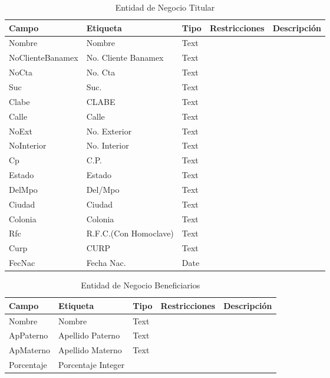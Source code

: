 \begin{table}[H]
	\caption{Entidad de Negocio Titular}
	\label{tab:fields-dom-TitularContrato}
	\begin{center}
	\begin{tabularx}{0.90\linewidth}{ X X X X X }
		\hline
		\textbf{Campo} &
		\textbf{Etiqueta} &
		\textbf{Tipo} &
		\textbf{Restricciones} &
		\textbf{Descripci\'on} \\
		\hline
		Nombre &
		Nombre &
		Text &
		 &
		 \\
		NoClienteBanamex &
		No. Cliente Banamex &
		Text &
		 &
		 \\
		NoCta &
		No. Cta &
		Text &
		 &
		 \\
		Suc &
		Suc. &
		Text &
		 &
		 \\
		Clabe &
		CLABE &
		Text &
		 &
		 \\
		Calle &
		Calle &
		Text &
		 &
		 \\
		NoExt &
		No. Exterior &
		Text &
		 &
		 \\
		NoInterior &
		No. Interior &
		Text &
		 &
		 \\
		Cp &
		C.P. &
		Text &
		 &
		 \\
		Estado &
		Estado &
		Text &
		 &
		 \\
		DelMpo &
		Del/Mpo &
		Text &
		 &
		 \\
		Ciudad &
		Ciudad &
		Text &
		 &
		 \\
		Colonia &
		Colonia &
		Text &
		 &
		 \\
		Rfc &
		R.F.C.(Con Homoclave) &
		Text &
		 &
		 \\
		Curp &
		CURP &
		Text &
		 &
		 \\
		FecNac &
		Fecha Nac. &
		Date &
		 &
		 \\
		\hline
	\end{tabularx}
	\end{center}
\end{table}
\begin{table}[H]
	\caption{Entidad de Negocio Beneficiarios}
	\label{tab:fields-dom-Beneficiario}
	\begin{center}
	\begin{tabularx}{0.90\linewidth}{ X X X X X }
		\hline
		\textbf{Campo} &
		\textbf{Etiqueta} &
		\textbf{Tipo} &
		\textbf{Restricciones} &
		\textbf{Descripci\'on} \\
		\hline
		Nombre &
		Nombre &
		Text &
		 &
		 \\
		ApPaterno &
		Apellido Paterno &
		Text &
		 &
		 \\
		ApMaterno &
		Apellido Materno &
		Text &
		 &
		 \\
		Porcentaje &
		Porcentaje %
		Integer &
		 &
		 \\
		\hline
	\end{tabularx}
	\end{center}
\end{table}
